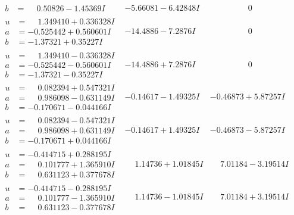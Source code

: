 \documentclass[1p]{elsarticle_modified}
\theoremstyle{definition}
\begin{document}
$$\begin{array}{c|c|c}
\begin{aligned}
b &= \phantom{-}0.50826 - 1.45369 I\end{aligned}
 & -5.66081 - 6.42848 I & \phantom{-0.000000 } 0 \\ \hline\begin{aligned}
u &= \phantom{-}1.349410 + 0.336328 I \\
a &= -0.525442 + 0.560601 I \\
b &= -1.37321 + 0.35227 I\end{aligned}
 & -14.4886 - 7.2876 I & \phantom{-0.000000 } 0 \\ \hline\begin{aligned}
u &= \phantom{-}1.349410 - 0.336328 I \\
a &= -0.525442 - 0.560601 I \\
b &= -1.37321 - 0.35227 I\end{aligned}
 & -14.4886 + 7.2876 I & \phantom{-0.000000 } 0 \\ \hline\begin{aligned}
u &= \phantom{-}0.082394 + 0.547321 I \\
a &= \phantom{-}0.986098 - 0.631149 I \\
b &= -0.170671 - 0.044166 I\end{aligned}
 & -0.14617 - 1.49325 I & -0.46873 + 5.87257 I \\ \hline\begin{aligned}
u &= \phantom{-}0.082394 - 0.547321 I \\
a &= \phantom{-}0.986098 + 0.631149 I \\
b &= -0.170671 + 0.044166 I\end{aligned}
 & -0.14617 + 1.49325 I & -0.46873 - 5.87257 I \\ \hline\begin{aligned}
u &= -0.414715 + 0.288195 I \\
a &= \phantom{-}0.101777 + 1.365910 I \\
b &= \phantom{-}0.631123 + 0.377678 I\end{aligned}
 & \phantom{-}1.14736 + 1.01845 I & \phantom{-}7.01184 - 3.19514 I \\ \hline\begin{aligned}
u &= -0.414715 - 0.288195 I \\
a &= \phantom{-}0.101777 - 1.365910 I \\
b &= \phantom{-}0.631123 - 0.377678 I\end{aligned}
 & \phantom{-}1.14736 - 1.01845 I & \phantom{-}7.01184 + 3.19514 I \\ \hline\begin{aligned}

\end{aligned}
\end{array}$$
\end{document}
